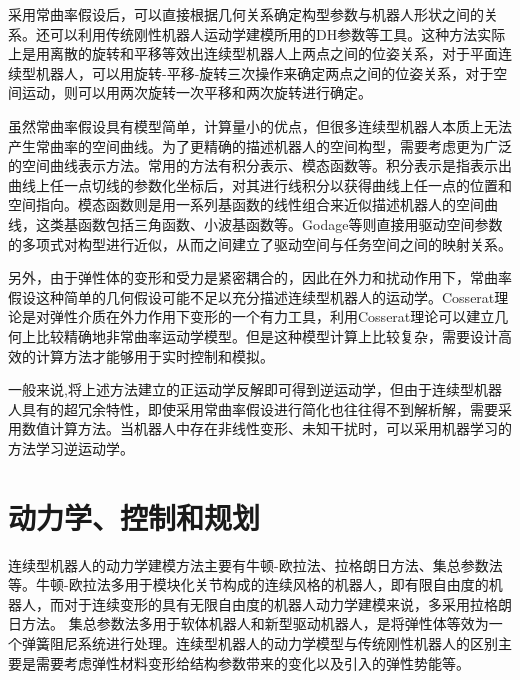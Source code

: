 采用常曲率假设后，可以直接根据几何关系确定构型参数与机器人形状之间的关系\cite{bailly_modeling_2005,neppalli_design_2007}。还可以利用传统刚性机器人运动学建模所用的DH参数等工具。这种方法实际上是用离散的旋转和平移等效出连续型机器人上两点之间的位姿关系\cite{hannan_kinematics_2003,hannan_analysis_2001,walker_continuous_2013}，对于平面连续型机器人，可以用旋转-平移-旋转三次操作来确定两点之间的位姿关系，对于空间运动，则可以用两次旋转一次平移和两次旋转进行确定\cite{hannan_kinematics_2003}。
 
虽然常曲率假设具有模型简单，计算量小的优点，但很多连续型机器人本质上无法产生常曲率的空间曲线。为了更精确的描述机器人的空间构型，需要考虑更为广泛的空间曲线表示方法。常用的方法有积分表示、模态函数等。积分表示是指表示出曲线上任一点切线的参数化坐标后，对其进行线积分以获得曲线上任一点的位置和空间指向\cite{chirikjian_hyper-redundant_1994,ivanescu_variable_1995}。模态函数则是用一系列基函数的线性组合来近似描述机器人的空间曲线，这类基函数包括三角函数\cite{chirikjian_modal_1994-1}、小波基函数\cite{gravagne_kinematics_2000}等。Godage等则直接用驱动空间参数的多项式对构型进行近似\cite{godage_shape_2011,godage_novel_2011,godage_dynamics_2016}，从而之间建立了驱动空间与任务空间之间的映射关系。

 
另外，由于弹性体的变形和受力是紧密耦合的，因此在外力和扰动作用下，常曲率假设这种简单的几何假设可能不足以充分描述连续型机器人的运动学。Cosserat理论是对弹性介质在外力作用下变形的一个有力工具，利用Cosserat理论可以建立几何上比较精确地非常曲率运动学模型\cite{trivedi_geometrically_2008,jones_three_2009,rucker_geometrically_2010,mahvash_stiffness_2011,renda_general_2012}。但是这种模型计算上比较复杂，需要设计高效的计算方法才能够用于实时控制和模拟\cite{till_efficient_2015}。

一般来说,将上述方法建立的正运动学反解即可得到逆运动学\cite{sears_steerable_2006,camarillo_configuration_2009,neppalli_closed-form_2009}，但由于连续型机器人具有的超冗余特性，即使采用常曲率假设进行简化也往往得不到解析解，需要采用数值计算方法\cite{jones_kinematics_2006,camarillo_mechanics_2008}。当机器人中存在非线性变形、未知干扰时，可以采用机器学习的方法学习逆运动学\cite{giorelli_feed-forward_2013,giorelli_neural_2015,rolf_efficient_2014,lakhal_hybrid_2016}。


\section{动力学、控制和规划}
连续型机器人的动力学建模方法主要有牛顿-欧拉法\cite{khalil_dynamic_2007,kang_dynamic_2011}、拉格朗日方法\cite{mochiyama_kinematics_2003,godage_shape_2011,marchese_dynamics_2015,falkenhahn_dynamic_2015,godage_dynamics_2016}、集总参数法\cite{falkenhahn_dynamic_2015,falkenhahn_dynamic_2017,giri_three_2011,zheng_dynamic_2012}等。牛顿-欧拉法多用于模块化关节构成的连续风格的机器人，即有限自由度的机器人，而对于连续变形的具有无限自由度的机器人动力学建模来说，多采用拉格朗日方法。
集总参数法多用于软体机器人和新型驱动机器人，是将弹性体等效为一个弹簧阻尼系统进行处理。连续型机器人的动力学模型与传统刚性机器人的区别主要是需要考虑弹性材料变形给结构参数带来的变化以及引入的弹性势能等。
 
